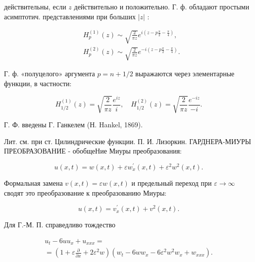 \documentclass[10pt]{article}
\begin{document}
действительны, если $z$ действительно и положительно. Г. ф. обладают простыми асимптотич. представлениями при больших $|z|$ :



\[

\begin{aligned}

& H_{p}^{(1)}(z) \sim \sqrt{\frac{2}{\pi z}} e^{i\left(z-p \frac{\pi}{2}-\frac{\pi}{4}\right)}, \\

& H_{p}^{(2)}(z) \sim \sqrt{\frac{2}{\pi z}} e^{-i\left(z-p \frac{\pi}{2}-\frac{\pi}{4}\right)} .

\end{aligned}

\]



Г. ф. «полуцелого» аргумента $p=n+1 / 2$ выражаются через элементарные функции, в частности:



\[

H_{1 / 2}^{(1)}(z)=\sqrt{\frac{2}{\pi z}} \frac{e^{i z}}{i}, \quad H_{1 / 2}^{(2)}(z)=\sqrt{\frac{2}{\pi z}} \frac{e^{-i z}}{-i} .

\]



Г. Ф. введены Г. Ганкелем (Н. Hankel, 1869).



Лит. см. при ст. Цилиндрические функции. П. И. Лизоркин. ГАРДНЕРА-МИУРЫ ПРЕОБРАЗОВАНИЕ - обобщеНие Миуры преобразования:



\[

u(x, t)=w(x, t)+\varepsilon w_{x}^{\prime}(x, t)+\varepsilon^{2} w^{2}(x, t) .

\]



Формальная замена $v(x, t)=\varepsilon w(x, t)$ и предельный переход при $\varepsilon \rightarrow \infty$ сводят это преобразование к преобразованию Миуры:



\[

u(x, t)=v_{x}^{\prime}(x, t)+v^{2}(x, t) .

\]



Для Г.-М. П. справедливо тождество



\[

\begin{gathered}

u_{t}-6 u u_{x}+u_{x x x}= \\

=\left(1+\varepsilon \frac{\partial}{\partial x}+2 \varepsilon^{2} w\right)\left(w_{t}-6 w w_{x}-6 \varepsilon^{2} w^{2} w_{x}+w_{x x x}\right) .

\end{gathered}

\]
\end{document}
